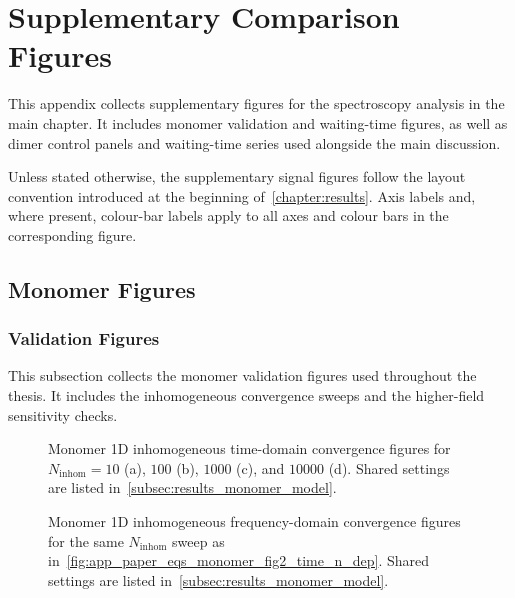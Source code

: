 \chapter{Supplementary Comparison Figures}
\label{app:supplementary_comparison_figures}

This appendix collects supplementary figures for the spectroscopy analysis in
the main chapter. It includes monomer validation and waiting-time figures, as
well as dimer control panels and waiting-time series used alongside the main
discussion.

Unless stated otherwise, the supplementary signal figures follow the layout
convention introduced at the beginning of~\autoref{chapter:results}. Axis
labels and, where present, colour-bar labels apply to all axes and colour bars
in the corresponding figure.

\section{Monomer Figures}
\label{app:sec:paper_eqs_monomer}

\subsection{Validation Figures}

This subsection collects the monomer validation figures used throughout the
thesis. It includes the inhomogeneous convergence sweeps and the higher-field
sensitivity checks.

\begin{figure}[htbp]
    \centering
    \caption{Monomer 1D inhomogeneous time-domain convergence figures for
    $N_{\mathrm{inhom}}=10$ (a), $100$ (b), $1000$ (c), and $10000$ (d).
    Shared settings are listed in~\autoref{subsec:results_monomer_model}.}
    \label{fig:app_paper_eqs_monomer_fig2_time_n_dep}
\end{figure}

\begin{figure}[htbp]
    \centering
    \caption{Monomer 1D inhomogeneous frequency-domain convergence figures for
    the same $N_{\mathrm{inhom}}$ sweep as
    in~\autoref{fig:app_paper_eqs_monomer_fig2_time_n_dep}. Shared settings
    are listed in~\autoref{subsec:results_monomer_model}.}
    \label{fig:app_paper_eqs_monomer_fig2_freq_n_dep}
\end{figure}


